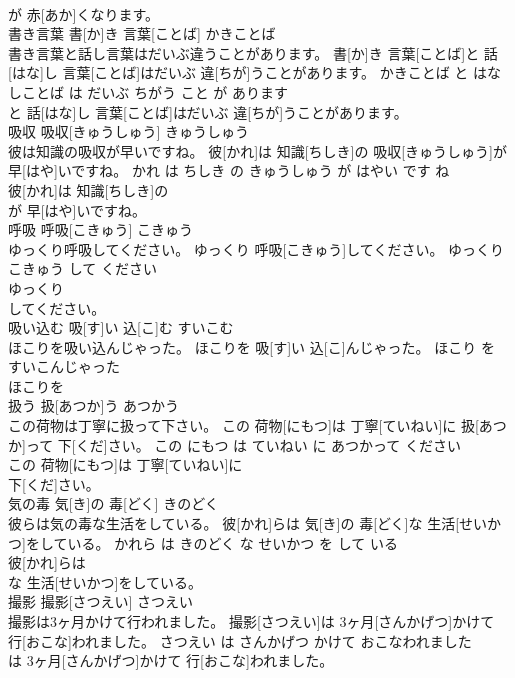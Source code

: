 \documentclass[8pt]{extreport}
\begin{document}
\begin{CJK}{UTF8}{min}
\\	が 赤[あか]くなります。			
\\	書き言葉	書[か]き 言葉[ことば]	かきことば	
\\	書き言葉と話し言葉はだいぶ違うことがあります。	書[か]き 言葉[ことば]と 話[はな]し 言葉[ことば]はだいぶ 違[ちが]うことがあります。	かきことば と はなしことば は だいぶ ちがう こと が あります	
\\	と 話[はな]し 言葉[ことば]はだいぶ 違[ちが]うことがあります。			
\\	吸収	吸収[きゅうしゅう]	きゅうしゅう	
\\	彼は知識の吸収が早いですね。	彼[かれ]は 知識[ちしき]の 吸収[きゅうしゅう]が 早[はや]いですね。	かれ は ちしき の きゅうしゅう が はやい です ね	
\\	彼[かれ]は 知識[ちしき]の
\\	が 早[はや]いですね。			
\\	呼吸	呼吸[こきゅう]	こきゅう	
\\	ゆっくり呼吸してください。	ゆっくり 呼吸[こきゅう]してください。	ゆっくり こきゅう して ください	
\\	ゆっくり
\\	してください。			
\\	吸い込む	吸[す]い 込[こ]む	すいこむ	
\\	ほこりを吸い込んじゃった。	ほこりを 吸[す]い 込[こ]んじゃった。	ほこり を すいこんじゃった	
\\	ほこりを
\\	扱う	扱[あつか]う	あつかう	
\\	この荷物は丁寧に扱って下さい。	この 荷物[にもつ]は 丁寧[ていねい]に 扱[あつか]って 下[くだ]さい。	この にもつ は ていねい に あつかって ください	
\\	この 荷物[にもつ]は 丁寧[ていねい]に
\\	下[くだ]さい。			
\\	気の毒	気[き]の 毒[どく]	きのどく	
\\	彼らは気の毒な生活をしている。	彼[かれ]らは 気[き]の 毒[どく]な 生活[せいかつ]をしている。	かれら は きのどく な せいかつ を して いる	
\\	彼[かれ]らは
\\	な 生活[せいかつ]をしている。			
\\	撮影	撮影[さつえい]	さつえい	
\\	撮影は3ヶ月かけて行われました。	撮影[さつえい]は 3ヶ月[さんかげつ]かけて 行[おこな]われました。	さつえい は さんかげつ かけて おこなわれました	
\\	は 3ヶ月[さんかげつ]かけて 行[おこな]われました。			

\end{CJK}
\end{document}
